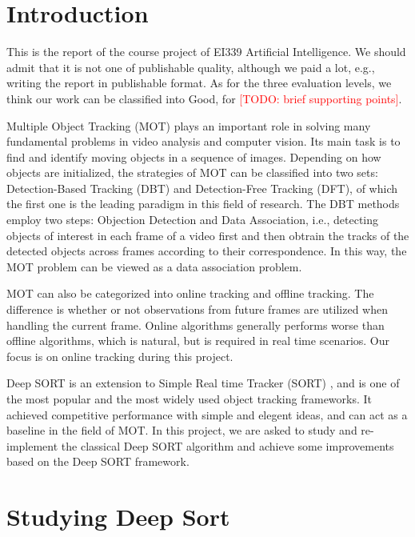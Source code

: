 \documentclass[conference]{IEEEtran}
\newcommand{\todo}[1]{\textcolor{red}{[TODO: #1]}}
\begin{document}



\section{Introduction}

This is the report of the course project of EI339 Artificial Intelligence. We should admit that it is not one of publishable quality, although we paid a lot, e.g., writing the report in publishable format. As for the three evaluation levels, we think our work can be classified into Good, for \todo{brief supporting points}.

Multiple Object Tracking (MOT) plays an important role in solving many fundamental problems in video analysis and computer vision. Its main task is to find and identify moving objects in a sequence of images. Depending on how objects are initialized, the strategies of MOT can be classified into two sets: Detection-Based Tracking (DBT) and Detection-Free Tracking (DFT), of which the first one is the leading paradigm in this field of research. The DBT methods employ two steps: Objection Detection and Data Association, i.e., detecting objects of interest in each frame of a video first and then obtrain the tracks of the detected objects across frames according to their correspondence. In this way, the MOT problem can be viewed as a data association problem.

MOT can also be categorized into online tracking and offline tracking. The difference is whether or not observations from future frames are utilized when handling the current frame. Online algorithms generally performs worse than offline algorithms, which is natural, but is required in real time scenarios. Our focus is on online tracking during this project.

Deep SORT \cite{Wojke2017simple} is an extension to Simple Real time Tracker (SORT) \cite{Bewley2016_sort}, and is one of the most popular and the most widely used object tracking frameworks. It achieved competitive performance with simple and elegent ideas, and can act as a baseline in the field of MOT. In this project, we are asked to study and re-implement the classical Deep SORT algorithm and achieve some improvements based on the Deep SORT framework.

\section{Studying Deep Sort}
\end{document}
